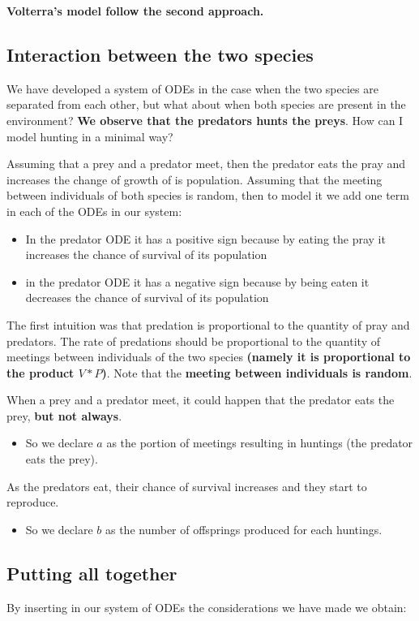 \textbf{Volterra's model follow the second approach.}

\subsection{Interaction between the two species}
We have developed a system of ODEs in the case when the two species are separated from each other, but what about when both species are present in the environment? \textbf{We observe that the predators hunts the preys}. How can I model hunting in a minimal way? \par
Assuming that a prey and a predator meet, then the predator eats the pray and increases the change of growth of is population. Assuming that the meeting between individuals of both species is random, then to model it we add one term in each of the ODEs in our system:

\begin{itemize}
    \item In the predator ODE it has a positive sign because by eating the pray it increases the chance of survival of its population
    \item in the predator ODE it has a negative sign because by being eaten it decreases the chance of survival of its population
\end{itemize}


The first intuition was that predation is proportional to the quantity of pray and predators. The rate of predations should be proportional to the quantity of meetings between individuals of the two species \textbf{(namely it is proportional to the product $V * P$)}. Note that the \textbf{meeting between individuals is random}.\par
When a prey and a predator meet, it could happen that the predator eats the prey, \textbf{but not always}. 
\begin{itemize}
    \item So we declare $a$ as the portion of meetings resulting in huntings (the predator eats the prey).
\end{itemize}

As the predators eat, their chance of survival increases and they start to reproduce. 
\begin{itemize}
    \item So we declare $b$ as the number of offsprings produced for each huntings.
\end{itemize}

\subsection{Putting all together}
By inserting in our system of ODEs the considerations we have made we obtain:


